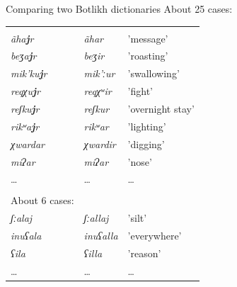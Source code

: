 \documentclass[13pt, t]{beamer}
\begin{document}
\begin{frame}{Comparing two Botlikh dictionaries}
About 25 cases:\\

\begin{tabular}{lll}
\citep{alekseev2019} &\citep{saidovaabusov2012} & \\
\textit{ãha\textbf{\underline{j}}r}   & \textit{ãhar}   & 'message’        \\
\textit{beʒa\textbf{\underline{j}}r}   & \textit{beʒir}   & 'roasting’       \\
\textit{mik'ku\textbf{\underline{j}}r} & \textit{mik'ːur} & 'swallowing’     \\
\textit{reqχu\textbf{\underline{j}}r}  & \textit{reqχʷir} & 'fight’          \\
\textit{reʃku\textbf{\underline{j}}r}  & \textit{reʃkur}  & 'overnight stay’ \\
\textit{rikʷa\textbf{\underline{j}}r}  & \textit{rikʷar} & 'lighting’     \\ \hline
\textit{χwardar} & \textit{χwardir} & 'digging' \\
\textit{miʔar} & \textit{miʔar} & 'nose'\\ 
\dots & \dots & \dots \\ 
& & \\
About 6 cases: & & \\
\textit{ʃːalaj} & \textit{ʃːallaj} & 'silt' \\
\textit{inuʕala} & \textit{inuʕalla} & 'everywhere' \\
\textit{ʕila} & \textit{ʕilla} & 'reason' \\
\dots & \dots & \dots \\
\end{tabular}
\end{frame}


\end{document}
